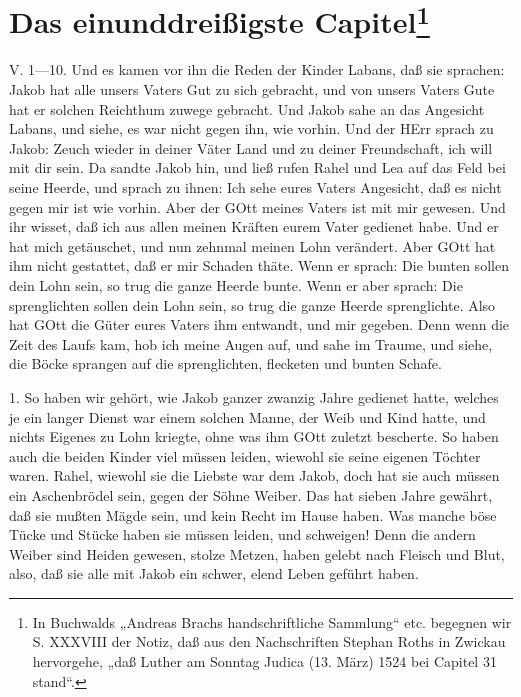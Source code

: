 \section[Das einunddreißigste Capitel]{Das einunddreißigste Capitel\footnote{In Buchwalds „Andreas Brachs handschriftliche Sammlung“ etc. begegnen wir S. XXXVIII der Notiz, daß aus den Nachschriften Stephan Roths in Zwickau hervorgehe, „daß Luther am Sonntag Judica (13. März) 1524 bei Capitel 31 stand“.}}

\begin{schriftzitat}
V. 1—10. Und es kamen vor ihn die Reden der Kinder Labans, daß sie sprachen: Jakob hat alle unsers Vaters Gut zu sich gebracht, und von unsers Vaters Gute hat er solchen Reichthum zuwege gebracht. Und Jakob sahe an das Angesicht Labans, und siehe, es war nicht gegen ihn, wie vorhin. Und der HErr sprach zu Jakob: Zeuch wieder in deiner Väter Land und zu deiner Freundschaft, ich will mit dir sein. Da sandte Jakob hin, und ließ rufen Rahel und Lea auf das Feld bei seine Heerde, und sprach zu ihnen: Ich sehe eures Vaters Angesicht, daß es nicht gegen mir ist wie vorhin. Aber der GOtt meines Vaters ist mit mir gewesen. Und ihr wisset, daß ich aus allen meinen Kräften eurem Vater gedienet habe. Und er hat mich getäuschet, und nun zehnmal meinen Lohn verändert. Aber GOtt hat ihm nicht gestattet, daß er mir Schaden thäte. Wenn er sprach: Die bunten sollen dein Lohn sein, so trug die ganze Heerde bunte. Wenn er aber sprach: Die sprenglichten sollen dein Lohn sein, so trug die ganze Heerde sprenglichte. Also hat GOtt die Güter eures Vaters ihm entwandt, und mir gegeben. Denn wenn die Zeit des Laufs kam, hob ich meine Augen auf, und sahe im Traume, und siehe, die Böcke sprangen auf die sprenglichten, flecketen und bunten Schafe.
\end{schriftzitat}

1. So haben wir gehört, wie Jakob ganzer zwanzig Jahre gedienet hatte, welches je ein langer Dienst war einem solchen Manne, der Weib und Kind hatte, und nichts Eigenes zu Lohn kriegte, ohne was ihm GOtt zuletzt bescherte. So haben auch die beiden Kinder viel müssen leiden, wiewohl sie seine eigenen Töchter waren. Rahel, wiewohl sie die Liebste war dem Jakob, doch hat sie auch müssen ein Aschenbrödel sein, gegen der Söhne Weiber. Das hat sieben Jahre gewährt, daß sie mußten Mägde sein, und kein Recht im Hause haben. Was manche böse Tücke und Stücke haben sie müssen leiden, und schweigen! Denn die andern Weiber sind Heiden gewesen, stolze Metzen, haben gelebt nach Fleisch und Blut, also, daß sie alle mit Jakob ein schwer, elend Leben geführt haben.

